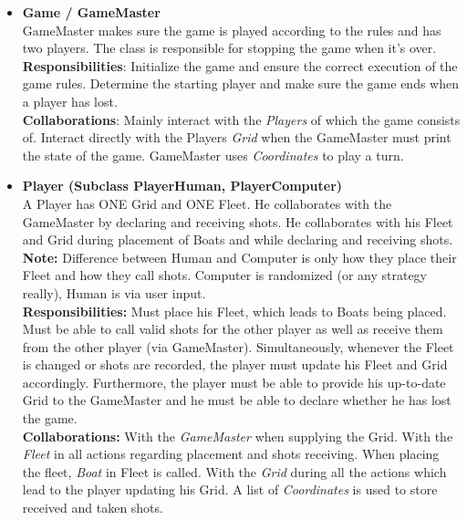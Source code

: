 \documentclass{article}
\begin{document}
\begin{itemize}
    \item \textbf{Game / GameMaster}\\
    GameMaster makes sure the game is played according to the rules and has two players. The class is responsible for stopping the game when it's over.\\
    \textbf{Responsibilities}: Initialize the game and ensure the correct execution of the game rules. Determine the starting player and make sure the game ends when a player has lost.\\
    \textbf{Collaborations}: Mainly interact with the \textit{Players} of which the game consists of. Interact directly with the Players \textit{Grid} when the GameMaster must print the state of the game. GameMaster uses \textit{Coordinates} to play a turn.
\\
    \item \textbf{Player (Subclass PlayerHuman, PlayerComputer)}\\
    A Player has ONE Grid and ONE Fleet. He collaborates with the GameMaster by declaring and receiving shots. He collaborates with his Fleet and Grid during placement of Boats and while declaring and receiving shots.\\
    \textbf{Note:} Difference between Human and Computer is only how they place their Fleet and how they call shots. Computer is randomized (or any strategy really), Human is via user input.\\
    \textbf{Responsibilities:} Must place his Fleet, which leads to Boats being placed. Must be able to call valid shots for the other player as well as receive them from the other player (via GameMaster). Simultaneously, whenever the Fleet is changed or shots are recorded, the player must update his Fleet and Grid accordingly. Furthermore, the player must be able to provide his up-to-date Grid to the GameMaster and he must be able to declare whether he has lost the game.\\
    \textbf{Collaborations:} With the \textit{GameMaster} when supplying the Grid. With the \textit{Fleet} in all actions regarding placement and shots receiving. When placing the fleet, \textit{Boat} in Fleet is called. With the \textit{Grid} during all the actions which lead to the player updating his Grid. A list of \textit{Coordinates} is used to store received and taken shots.
    

\end{itemize}
\end{document}
